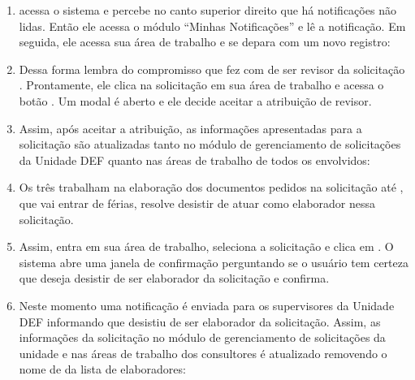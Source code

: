 \begin{landscape}
\begin{enumerate}
	\item \RU acessa o sistema e percebe no canto superior direito que há notificações não lidas. Então ele acessa o módulo ``Minhas Notificações'' e lê a notificação. Em seguida, ele acessa sua área de trabalho e se depara com um novo registro:
	
	
	\item Dessa forma \RU lembra do compromisso que fez com \ED de ser revisor da solicitação \SOLT. Prontamente, ele clica na solicitação em sua área de trabalho e acessa o botão \bAvaliar. Um modal é aberto e ele decide aceitar a atribuição de revisor.
	
	\item Assim, após \RU aceitar a atribuição, as informações apresentadas para a solicitação \SOLT são atualizadas tanto no módulo de gerenciamento de solicitações da Unidade DEF quanto nas áreas de trabalho de todos os envolvidos:
	
	
	

	
	\item Os três trabalham na elaboração dos documentos pedidos na solicitação até \ED, que vai entrar de férias, resolve desistir de atuar como elaborador nessa solicitação.
	
	\item Assim, \ED entra em sua área de trabalho, seleciona a solicitação e clica em \bDesistir. O sistema abre uma janela de confirmação perguntando se o usuário tem certeza que deseja desistir de ser elaborador da solicitação e \ED confirma.
	
	\item Neste momento uma notificação é enviada para os supervisores da Unidade DEF informando que \ED desistiu de ser elaborador da solicitação. Assim, as informações da solicitação no módulo de gerenciamento de solicitações da unidade e nas áreas de trabalho dos consultores é atualizado removendo o nome de \ED da lista de elaboradores:
	

\end{enumerate}
\end{landscape}
